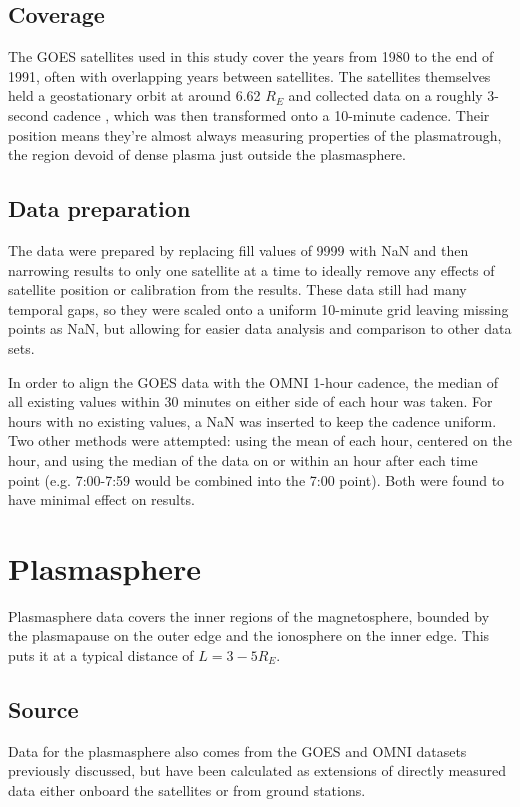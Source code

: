 \subsection{Coverage}
The GOES satellites used in this study cover the years from 1980 to the end of 1991, often with overlapping years between satellites. The satellites themselves held a geostationary orbit at around 6.62 $R_E$ and collected data on a roughly 3-second cadence \citep{GOESDataSource}, which was then transformed onto a 10-minute cadence. Their position means they're almost always measuring properties of the plasmatrough, the region devoid of dense plasma just outside the plasmasphere.

\subsection{Data preparation}
The data were prepared by replacing fill values of 9999 with NaN and then narrowing results to only one satellite at a time to ideally remove any effects of satellite position or calibration from the results. These data still had many temporal gaps, so they were scaled onto a uniform 10-minute grid leaving missing points as NaN, but allowing for easier data analysis and comparison to other data sets.

In order to align the GOES data with the OMNI 1-hour cadence, the median of all existing values within 30 minutes on either side of each hour was taken. For hours with no existing values, a NaN was inserted to keep the cadence uniform. Two other methods were attempted: using the mean of each hour, centered on the hour, and using the median of the data on or within an hour after each time point (e.g. 7:00-7:59 would be combined into the 7:00 point). Both were found to have minimal effect on results.

\section{Plasmasphere}
Plasmasphere data covers the inner regions of the magnetosphere, bounded by the plasmapause on the outer edge and the ionosphere on the inner edge. This puts it at a typical distance of $L=3-5R_E$. 

\subsection{Source}
Data for the plasmasphere also comes from the GOES and OMNI datasets previously discussed, but have been calculated as extensions of directly measured data either onboard the satellites or from ground stations. 

